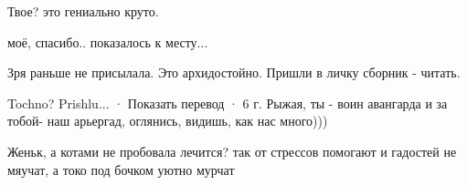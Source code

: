 \begin{itemize}
Твое? это гениально круто.

моё, спасибо.. показалось к месту...

Зря раньше не присылала. Это архидостойно. Пришли в личку сборник - читать.

Tochno? Prishlu...
 · Показать перевод · 6 г.
Рыжая, ты - воин авангарда и за тобой- наш арьергад, оглянись, видишь, как нас много)))

Женьк, а котами не пробовала лечится? так от стрессов помогают и гадостей не мяучат, а токо под бочком уютно мурчат

\end{itemize}

